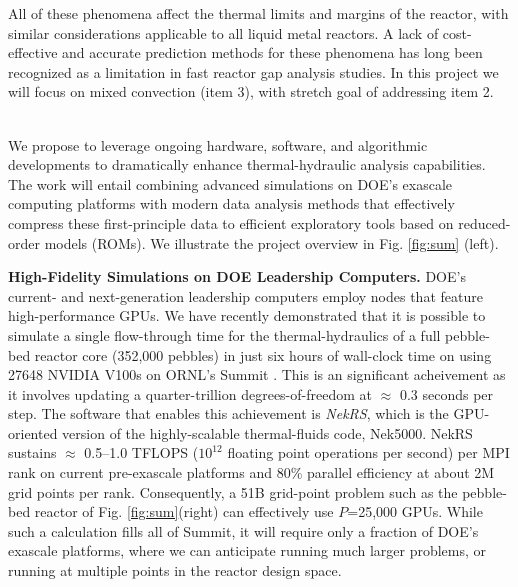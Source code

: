 All of these phenomena affect the thermal limits and margins of the reactor, with similar considerations applicable to all liquid metal reactors. A lack of cost-effective and accurate prediction methods for these phenomena has long been recognized as a limitation in fast reactor gap analysis studies. In this project we will focus on mixed convection (item 3), with stretch goal of addressing item 2.

 \\[-4ex]

We propose to leverage ongoing hardware, software, and algorithmic developments
to dramatically enhance thermal-hydraulic analysis capabilities.  The work will
entail combining advanced simulations on DOE's exascale computing platforms
with modern data analysis methods that effectively compress these
first-principle data to efficient exploratory tools based on reduced-order
models (ROMs).
We illustrate the project overview in Fig. \ref{fig:sum} (left).


\noindent
{\bf High-Fidelity Simulations on DOE Leadership Computers.}
  DOE's current- and next-generation leadership computers employ nodes that
  feature high-performance GPUs.
We have recently demonstrated that it is possible to simulate a single
flow-through time for the thermal-hydraulics of a full pebble-bed reactor core
(352,000 pebbles) in just six hours of wall-clock time on using 27648
NVIDIA V100s on ORNL's Summit \cite{sc22}.  This is an significant acheivement
as it involves updating a quarter-trillion degrees-of-freedom at $\approx$ 0.3
seconds per step.  The software that enables this achievement is {\em NekRS},
which is the GPU-oriented version of the highly-scalable thermal-fluids code,
Nek5000.
NekRS sustains $\approx$ 0.5--1.0 TFLOPS ($10^{12}$
floating point operations per second) per MPI rank on current pre-exascale
platforms and 80\% parallel efficiency at about 2M grid points per rank.
Consequently, a 51B grid-point problem such as the pebble-bed reactor of Fig.
\ref{fig:sum}(right) can effectively use $P$=25,000 GPUs. While such a calculation
fills all of Summit, it will require only a fraction of DOE's exascale
platforms, where we can anticipate running much larger problems, or running at
multiple points in the reactor design space.

